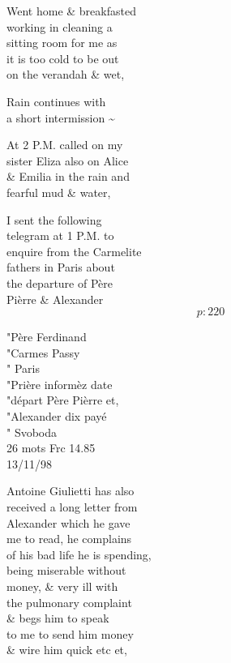 \documentclass{report}
\begin{document}
	\par{
 	Went home \& breakfasted\ \\working in cleaning a\ \\sitting room for me as\ \\it is too cold to be out\ \\on the verandah \& wet,\ \\
	}

	\par{
 	Rain continues with\ \\a short intermission \~{}\ \\
	}

	\par{
 	At 2 P.M. called on my\ \\sister Eliza also on Alice\ \\\& Emilia in the rain and\ \\fearful mud \& water,\ \\
	}

	\par{
 	I sent the following\ \\telegram at 1 P.M. to\ \\enquire from the Carmelite\ \\fathers in Paris about\ \\the departure of Père\ \\Pièrre \& Alexander\ \\
  \[p: 220 \]

	}

	\par{
 	"Père Ferdinand\ \\"Carmes Passy\ \\" Paris\ \\"Prière informèz date\ \\"départ Père Pièrre et,\ \\"Alexander dix payé\ \\" Svoboda\ \\26 mots Frc 14.85\ \\13/11/98\ \\
	}

	\par{
 	Antoine Giulietti has also\ \\received a long letter from\ \\Alexander which he gave\ \\me to read, he complains\ \\of his bad life he is spending,\ \\being miserable without\ \\money, \& very ill with\ \\the pulmonary complaint\ \\\& begs him to speak\ \\to me to send him money\ \\\& wire him quick etc et,\ \\
	}
\end{document}
